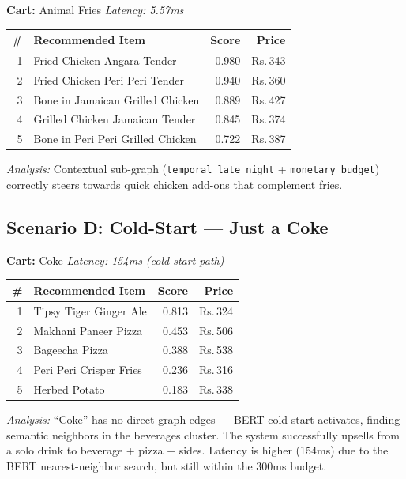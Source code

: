\documentclass[10pt, twocolumn, a4paper]{article}
\newcommand{\Rs}{\textrm{Rs.\,}}
\begin{document}
\textbf{Cart:} Animal Fries \hfill \textit{Latency: 5.57ms}

\begin{center}
\small
\begin{tabular}{@{}r l r r@{}}
\toprule
\textbf{\#} & \textbf{Recommended Item} & \textbf{Score} & \textbf{Price} \\
\midrule
1 & Fried Chicken Angara Tender & 0.980 & \Rs343 \\
2 & Fried Chicken Peri Peri Tender & 0.940 & \Rs360 \\
3 & Bone in Jamaican Grilled Chicken & 0.889 & \Rs427 \\
4 & Grilled Chicken Jamaican Tender & 0.845 & \Rs374 \\
5 & Bone in Peri Peri Grilled Chicken & 0.722 & \Rs387 \\
\bottomrule
\end{tabular}
\end{center}
\textit{Analysis:} Contextual sub-graph (\texttt{temporal\_late\_night} + \texttt{monetary\_budget}) correctly steers towards quick chicken add-ons that complement fries.

\subsection{Scenario D: Cold-Start --- Just a Coke}

\textbf{Cart:} Coke \hfill \textit{Latency: 154ms (cold-start path)}

\begin{center}
\small
\begin{tabular}{@{}r l r r@{}}
\toprule
\textbf{\#} & \textbf{Recommended Item} & \textbf{Score} & \textbf{Price} \\
\midrule
1 & Tipsy Tiger Ginger Ale & 0.813 & \Rs324 \\
2 & Makhani Paneer Pizza & 0.453 & \Rs506 \\
3 & Bageecha Pizza & 0.388 & \Rs538 \\
4 & Peri Peri Crisper Fries & 0.236 & \Rs316 \\
5 & Herbed Potato & 0.183 & \Rs338 \\
\bottomrule
\end{tabular}
\end{center}
\textit{Analysis:} ``Coke'' has no direct graph edges --- BERT cold-start activates, finding semantic neighbors in the beverages cluster. The system successfully upsells from a solo drink to beverage + pizza + sides. Latency is higher (154ms) due to the BERT nearest-neighbor search, but still within the 300ms budget.
\end{document}
